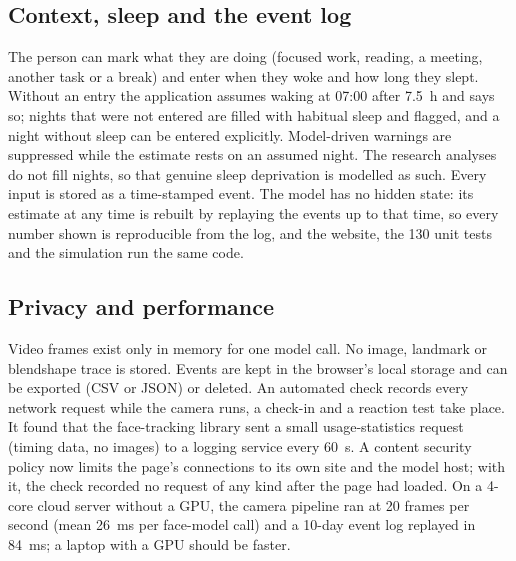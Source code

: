 \subsection{Context, sleep and the event log}
The person can mark what they are doing (focused work, reading, a meeting, another task or a break) and enter when they woke and how long they slept. Without an entry the application assumes waking at 07:00 after 7.5~h and says so; nights that were not entered are filled with habitual sleep and flagged, and a night without sleep can be entered explicitly. Model-driven warnings are suppressed while the estimate rests on an assumed night. The research analyses do not fill nights, so that genuine sleep deprivation is modelled as such. Every input is stored as a time-stamped event. The model has no hidden state: its estimate at any time is rebuilt by replaying the events up to that time, so every number shown is reproducible from the log, and the website, the 130 unit tests and the simulation run the same code.

\subsection{Privacy and performance}
Video frames exist only in memory for one model call. No image, landmark or blendshape trace is stored. Events are kept in the browser's local storage and can be exported (CSV or JSON) or deleted. An automated check records every network request while the camera runs, a check-in and a reaction test take place. It found that the face-tracking library sent a small usage-statistics request (timing data, no images) to a logging service every 60~s. A content security policy now limits the page's connections to its own site and the model host; with it, the check recorded no request of any kind after the page had loaded. On a 4-core cloud server without a GPU, the camera pipeline ran at 20 frames per second (mean 26~ms per face-model call) and a 10-day event log replayed in 84~ms; a laptop with a GPU should be faster.
